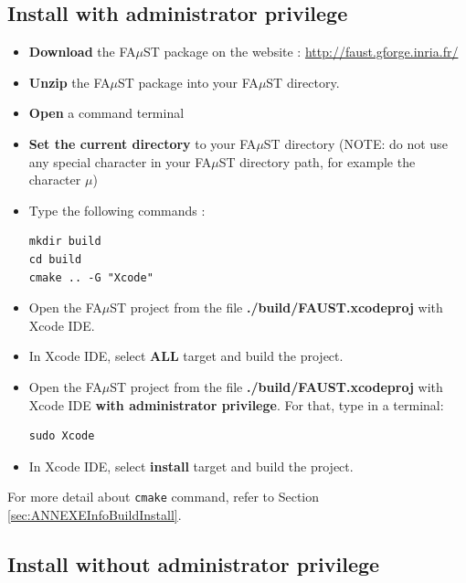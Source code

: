 \subsection{Install with administrator privilege}\label{sec:XcodeUnixBuildInstallAdmin}
 
\begin{itemize}
\item \textbf{Download} the FA$\mu$ST package on the website :  \url{http://faust.gforge.inria.fr/}
\item \textbf{Unzip} the FA$\mu$ST package into your FA$\mu$ST directory.
\item \textbf{Open} a command terminal
\item \textbf{Set the current directory} to your FA$\mu$ST directory (NOTE: do not use any special character in your FA$\mu$ST directory path, for example the character $\mu$)
\item Type the following commands : 
\begin{lstlisting}
mkdir build
cd build
cmake .. -G "Xcode"
\end{lstlisting}

\item Open the FA$\mu$ST project from the file \textbf{./build/FAUST.xcodeproj} with Xcode IDE. 
\item In Xcode IDE, select \textbf{ALL} target and build the project. 
\item Open the FA$\mu$ST project from the file \textbf{./build/FAUST.xcodeproj} with Xcode IDE \textbf{with administrator privilege}. For that, type in a terminal:
\begin{lstlisting}
sudo Xcode
\end{lstlisting}
\item In Xcode IDE, select \textbf{install} target and build the project. 
\end{itemize}

For more detail about \texttt{cmake} command, refer to Section \ref{sec:ANNEXEInfoBuildInstall}.


\subsection{Install without administrator privilege}\label{sec:XcodeUnixBuildInstallNOAdmin}
 
